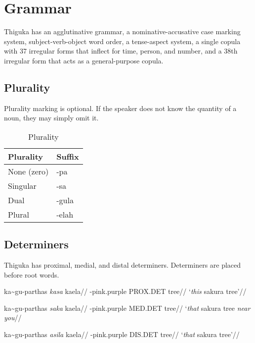 
\chapter{Grammar}
Thiguka has an agglutinative grammar, a nominative-accusative case marking system, subject-verb-object word order, a tense-aspect system, a single copula with 37 irregular forms that inflect for time, person, and number, and a 38th irregular form that acts as a general-purpose copula.

\section{Plurality}
Plurality marking is optional.
If the speaker does not know the quantity of a noun, they may simply omit it.

\begin{table}[h!]
    \centering
    \caption{Plurality}
    \begin{tabularx}{8cm}{|X|X|}
        \hline
        \textbf{Plurality} & \textbf{Suffix} \\
        \hline
        None (zero) & -pa \\
        Singular & -sa \\
        Dual & -gula \\
        Plural & -elah \\
        \hline
    \end{tabularx}
\end{table}





\section{Determiners}
Thiguka has proximal, medial, and distal determiners. Determiners are placed before root words. 

\ex
\begingl
    \gla ka\~{}{}gu-parthas \emph{kasa} kaela//  
    \glb \agradj{}-pink.purple PROX.DET tree//  
    \glft `\emph{this} sakura tree'//  
\endgl
\xe

\ex
\begingl
    \gla ka\~{}{}gu-parthas \emph{saka} kaela//  
    \glb \agradj{}-pink.purple MED.DET tree//  
    \glft `\emph{that} sakura tree \emph{near you}//  
\endgl
\xe

\ex
\begingl
    \gla ka\~{}{}gu-parthas \emph{asila} kaela//  
    \glb \agradj{}-pink.purple DIS.DET tree//  
    \glft `\emph{that} sakura tree'//  
\endgl
\xe

